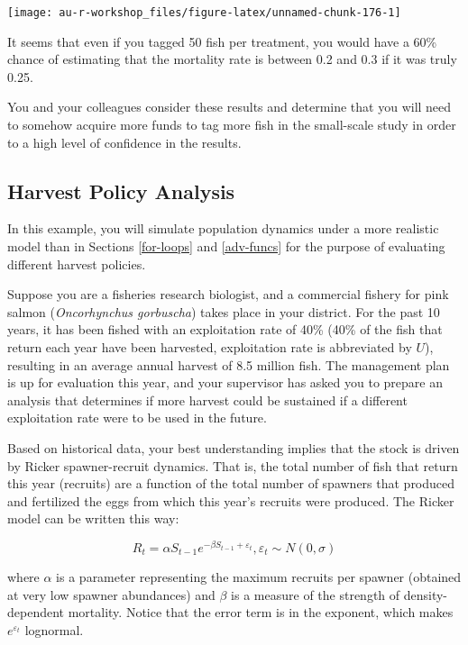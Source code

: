 \documentclass[]{book}
\theoremstyle{definition}
\theoremstyle{definition}
\theoremstyle{definition}
\theoremstyle{remark}
\begin{document}
\begin{center}\texttt{[image: au-r-workshop\_files/figure-latex/unnamed-chunk-176-1]} \end{center}

It seems that even if you tagged 50 fish per treatment, you would have a
60\% chance of estimating that the mortality rate is between 0.2 and 0.3
if it was truly 0.25.

You and your colleagues consider these results and determine that you
will need to somehow acquire more funds to tag more fish in the
small-scale study in order to a high level of confidence in the results.

\subsection{Harvest Policy Analysis}\label{harv-ex}

In this example, you will simulate population dynamics under a more
realistic model than in Sections \ref{for-loops} and \ref{adv-funcs} for
the purpose of evaluating different harvest policies.

Suppose you are a fisheries research biologist, and a commercial fishery
for pink salmon (\emph{Oncorhynchus gorbuscha}) takes place in your
district. For the past 10 years, it has been fished with an exploitation
rate of 40\% (40\% of the fish that return each year have been
harvested, exploitation rate is abbreviated by \(U\)), resulting in an
average annual harvest of 8.5 million fish. The management plan is up
for evaluation this year, and your supervisor has asked you to prepare
an analysis that determines if more harvest could be sustained if a
different exploitation rate were to be used in the future.

Based on historical data, your best understanding implies that the stock
is driven by Ricker spawner-recruit dynamics. That is, the total number
of fish that return this year (recruits) are a function of the total
number of spawners that produced and fertilized the eggs from which this
year's recruits were produced. The Ricker model can be written this way:

\begin{equation}
  R_t = \alpha S_{t-1} e^{-\beta S_{t-1} + \varepsilon_t} ,\varepsilon_t \sim N(0,\sigma)
\label{eq:ricker-ch4}
\end{equation}

where \(\alpha\) is a parameter representing the maximum recruits per
spawner (obtained at very low spawner abundances) and \(\beta\) is a
measure of the strength of density-dependent mortality. Notice that the
error term is in the exponent, which makes \(e^{\varepsilon_t}\)
lognormal.
\end{document}
